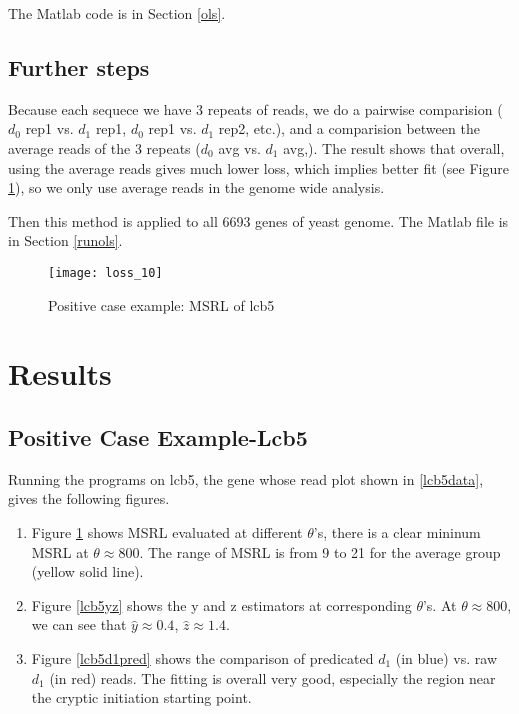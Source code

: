 \documentclass{article}
\begin{document}
The Matlab code is in Section \ref{ols}.

\subsection{Further steps}

Because each sequece we have 3 repeats of reads, we do a pairwise comparision ($d_0$ rep1 vs. $d_1$ rep1, $d_0$ rep1 vs. $d_1$ rep2, etc.), and a comparision between the average reads of the 3 repeats ($d_0$ avg vs. $d_1$ avg,). The result shows that overall, using the average reads gives much lower loss, which implies better fit (see Figure \ref{lcb5loss}), so we only use average reads in the genome wide analysis.

Then this method is applied to all 6693 genes of yeast genome. The Matlab file is in Section \ref{runols}.

\begin{figure}[h]
	\texttt{[image: loss\_10]}
	\caption{Positive case example: MSRL of lcb5}
	\label{lcb5loss}
\end{figure}

\section{Results}
\subsection{Positive Case Example-Lcb5}

Running the programs on lcb5, the gene whose read plot shown in \ref{lcb5data}, gives the following figures. 

\begin{enumerate}
	\item Figure \ref{lcb5loss} shows MSRL evaluated at different $\theta$'s, there is a clear mininum MSRL at $\theta \approx 800$. The range of MSRL is from 9 to 21 for the average group (yellow solid line).
	\item Figure \ref{lcb5yz} shows the y and z estimators at corresponding $\theta$'s. At $\theta \approx 800$, we can see that $\hat{y} \approx 0.4$, $\hat{z} \approx 1.4$.
	\item Figure \ref{lcb5d1pred} shows the comparison of predicated $d_1$ (in blue) vs. raw $d_1$ (in red) reads. The fitting is overall very good, especially the region near the cryptic initiation starting point.
\end{enumerate}
\end{document}
